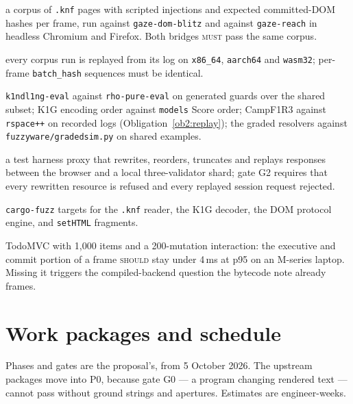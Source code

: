 \documentclass[11pt]{article}
\theoremstyle{definition}
\theoremstyle{remark}
\newcommand{\Camp}{CampF1R3}
\newcommand{\MUST}{\textsc{must}}
\newcommand{\SHOULD}{\textsc{should}}
\newcommand{\code}[1]{\texttt{#1}}
\begin{document}
\begin{description}[leftmargin=1.5em,style=nextline,itemsep=2pt]
\item[Protocol conformance] a corpus of \code{.knf} pages with scripted injections
  and expected committed-DOM hashes per frame, run against \code{gaze-dom-blitz} and
  against \code{gaze-reach} in headless Chromium and Firefox. Both bridges \MUST{}
  pass the same corpus.
\item[Determinism] every corpus run is replayed from its log on \code{x86\_64},
  \code{aarch64} and \code{wasm32}; per-frame \code{batch\_hash} sequences must be
  identical.
\item[Differential] \code{k1ndl1ng-eval} against \code{rho-pure-eval} on generated
  guards over the shared subset; K1G encoding order against \code{models} Score order;
  \Camp{} against \code{rspace++} on recorded logs (Obligation~\ref{ob2:replay}); the
  graded resolvers against \code{fuzzyware/gradedsim.py} on shared examples.
\item[Hostile proxy] a test harness proxy that rewrites, reorders, truncates and
  replays responses between the browser and a local three-validator shard; gate G2
  requires that every rewritten resource is refused and every replayed session
  request rejected.
\item[Fuzzing] \code{cargo-fuzz} targets for the \code{.knf} reader, the K1G decoder,
  the DOM protocol engine, and \code{setHTML} fragments.
\item[Performance] TodoMVC with 1{,}000 items and a 200-mutation interaction: the
  executive and commit portion of a frame \SHOULD{} stay under 4\,ms at p95 on an
  M-series laptop. Missing it triggers the compiled-backend question the bytecode
  note already frames.
\end{description}

\section{Work packages and schedule}\label{sec:plan}

Phases and gates are the proposal's, from 5 October 2026. The upstream packages
move into P0, because gate G0 --- a program changing rendered text --- cannot pass
without ground strings and apertures. Estimates are engineer-weeks.
\end{document}
